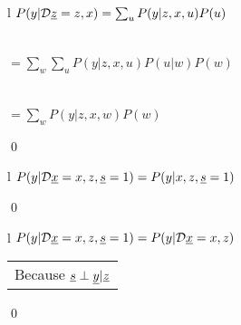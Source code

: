 \begin{claim}
\label{cl-decWhy}
\decWhy
\end{claim}
\proof
\begin{longtable}{l}
\color{red}
$P(y|{\cal D}{\underline{z}}=z,x)=
\sum_u P(y|z,x,u)P(u)
$
\\
\xymatrix{\\=}
\\
\\
\color{red}
$=\sum_w\sum_u
P(y|z,x,u)P(u|w)P(w)
$
\\
\xymatrix{\\=}
\\
\\
\color{red}
$=\sum_w
P(y|z,x,w)P(w)
$
\\
\xymatrix{\\=}
\end{longtable}
\qed

\begin{claim}
\label{cl-decTransportTrivial}
\decTransportTrivial
\end{claim}
\proof
\begin{longtable}{l}
\color{red}
$P(y|{\cal D}{\underline{x}}=x, z, {\underline{s}}=1)=
P(y|x, z, {\underline{s}}=1)$
\\
\xymatrix{
\\=
}
\end{longtable}
\qed

\begin{claim}
\label{cl-decTransportDirect}
\decTransportDirect
\end{claim}
\proof
\begin{longtable}{l}
\color{red}
$P(y|{\cal D}{\underline{x}}=x, z, {\underline{s}}=1)=
P(y|{\cal D}{\underline{x}}=x, z)$
\\
\xymatrix{\\=}
\begin{tabular}{l}
Because ${\underline{s}}\perp{\underline{y}}|{\underline{z}}$
\end{tabular}
\end{longtable}
\qed

